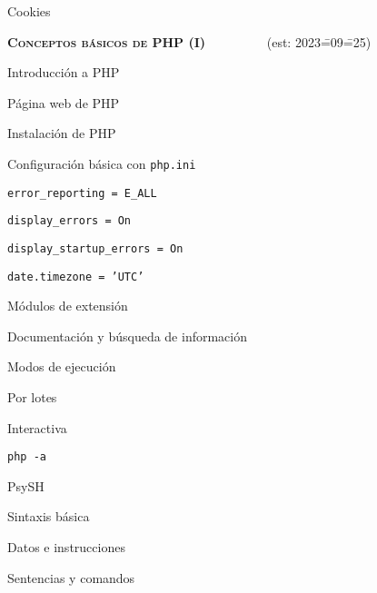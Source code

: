 \begin{longenum}
\begin{longenum}
\begin{longenum}
\begin{longenum}
            \end{longenum}
            \item Cookies
        \end{longenum}
    \end{longenum}
    \item \textbf{\textsc{Conceptos básicos de PHP (I)}} \ \ \ \ \ \ \ \ \ (est: 2023\==09\==25)
    \begin{longenum}
        \item Introducción a PHP
        \begin{longenum}
            \item Página web de PHP
            \item Instalación de PHP
            \item Configuración básica con \texttt{php.ini}
            \begin{longenum}
                \item \texttt{error\_reporting = E\_ALL}
                \item \texttt{display\_errors = On}
                \item \texttt{display\_startup\_errors = On}
                \item \texttt{date.timezone = 'UTC'}
            \end{longenum}
            \item Módulos de extensión
            \item Documentación y búsqueda de información
            \item Modos de ejecución
            \begin{longenum}
                \item Por lotes
                \item Interactiva
                \begin{longenum}
                    \item \texttt{php -a}
                    \item PsySH
                \end{longenum}
            \end{longenum}
        \end{longenum}
        \item Sintaxis básica
        \begin{longenum}
            \item Datos e instrucciones
            \item Sentencias y comandos

\end{longenum}
\end{longenum}
\end{longenum}
